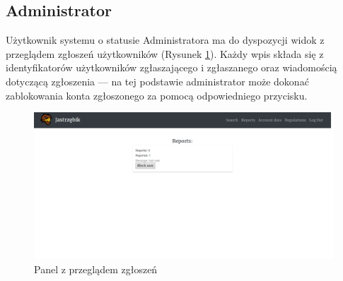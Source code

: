 \documentclass[a4paper,11pt]{article}
\begin{document}
    \subsection{Administrator}
    
    Użytkownik systemu o statusie Administratora ma do dyspozycji widok z przeglądem zgłoszeń użytkowników (Rysunek \ref{fig:Reports}). Każdy wpis składa się z identyfikatorów użytkowników zgłaszającego i zgłaszanego oraz wiadomością dotyczącą zgłoszenia --- na tej podstawie administrator może dokonać zablokowania konta zgłoszonego za pomocą odpowiedniego przycisku.

    \begin{figure}[H]
        \centering
        \includegraphics[width=1\textwidth]{img3/Reports.png}
        \caption{Panel z przeglądem zgłoszeń}
        \label{fig:Reports}
    \end{figure}
\end{document}
